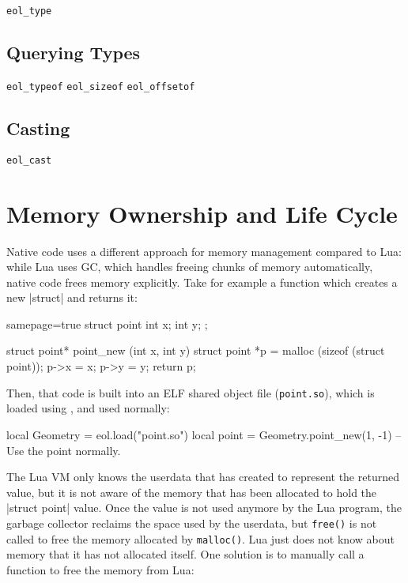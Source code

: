   \verb|eol_type| 

\subsection{Querying Types}

  \verb|eol_typeof|
  \verb|eol_sizeof|
  \verb|eol_offsetof|

\subsection{Casting}

  \verb|eol_cast|


\section{Memory Ownership and Life Cycle}

Native code uses a different approach for memory management compared to Lua:
while Lua uses \gls{GC}, which handles freeing chunks of memory automatically,
native code frees memory explicitly. Take for example a function which creates
a new \Mc|struct| and returns it:

\begin{ccode*}{samepage=true}
struct point { int x; int y; };

struct point* point_new (int x, int y) {
  struct point *p = malloc (sizeof (struct point));
  p->x = x;
  p->y = y;
  return p;
}
\end{ccode*}

Then, that code is built into an ELF shared object file (\verb|point.so|),
which is loaded using \Eol*, and used normally:

\begin{luacode}
local Geometry = eol.load("point.so")
local point = Geometry.point_new(1, -1)
-- Use the point normally.
\end{luacode}

The Lua VM only knows the userdata that \Eol* has created to represent the
returned value, but it is not aware of the memory that has been allocated to
hold the \Mc|struct point| value. Once the value is not used anymore by the
Lua program, the garbage collector reclaims the space used by the userdata,
but \verb|free()| is not called to free the memory allocated by
\verb|malloc()|. Lua just does not know about memory that it has not allocated
itself. One solution is to manually call a function to free the memory from
Lua:

